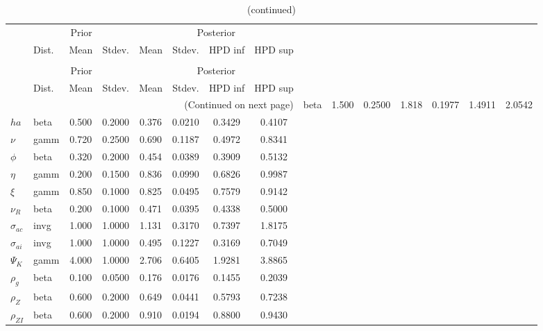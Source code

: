 
\begin{center}
\begin{longtable}{llcccccc} 
\caption{Results from Metropolis-Hastings (parameters)}
 \label{Table:MHPosterior:1}\\
\toprule 
  & \multicolumn{3}{c}{Prior}  &  \multicolumn{4}{c}{Posterior} \\
  \cmidrule(r{.75em}){2-4} \cmidrule(r{.75em}){5-8}
  & Dist. & Mean  & Stdev. & Mean & Stdev. & HPD inf & HPD sup\\
\midrule \endfirsthead 
\caption{(continued)}\\\toprule 
  & \multicolumn{3}{c}{Prior}  &  \multicolumn{4}{c}{Posterior} \\
  \cmidrule(r{.75em}){2-4} \cmidrule(r{.75em}){5-8}
  & Dist. & Mean  & Stdev. & Mean & Stdev. & HPD inf & HPD sup\\
\midrule \endhead 
\bottomrule \multicolumn{8}{r}{(Continued on next page)} \endfoot 
\bottomrule \endlastfoot 
${\sigma}$ & beta &   1.500 & 0.2500 &   1.818& 0.1977 &  1.4911 &  2.0542 \\ 
${ha}$ & beta &   0.500 & 0.2000 &   0.376& 0.0210 &  0.3429 &  0.4107 \\ 
$\nu$ & gamm &   0.720 & 0.2500 &   0.690& 0.1187 &  0.4972 &  0.8341 \\ 
${\phi}$ & beta &   0.320 & 0.2000 &   0.454& 0.0389 &  0.3909 &  0.5132 \\ 
${\eta}$ & gamm &   0.200 & 0.1500 &   0.836& 0.0990 &  0.6826 &  0.9987 \\ 
$\xi$ & gamm &   0.850 & 0.1000 &   0.825& 0.0495 &  0.7579 &  0.9142 \\ 
${\nu_R}$ & beta &   0.200 & 0.1000 &   0.471& 0.0395 &  0.4338 &  0.5000 \\ 
${\sigma_{ac}}$ & invg &   1.000 & 1.0000 &   1.131& 0.3170 &  0.7397 &  1.8175 \\ 
${\sigma_{ai}}$ & invg &   1.000 & 1.0000 &   0.495& 0.1227 &  0.3169 &  0.7049 \\ 
${\Psi_{K}}$ & gamm &   4.000 & 1.0000 &   2.706& 0.6405 &  1.9281 &  3.8865 \\ 
${\rho_g}$ & beta &   0.100 & 0.0500 &   0.176& 0.0176 &  0.1455 &  0.2039 \\ 
${\rho_Z}$ & beta &   0.600 & 0.2000 &   0.649& 0.0441 &  0.5793 &  0.7238 \\ 
${\rho_{ZI}}$ & beta &   0.600 & 0.2000 &   0.910& 0.0194 &  0.8800 &  0.9430 \\ 

\end{longtable}
\end{center}

